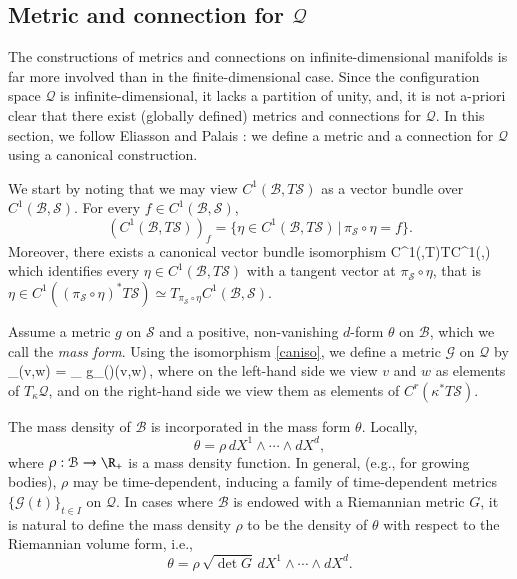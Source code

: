 \documentclass[smallextended]{svjour3}
\begin{document}
\subsection{Metric and connection for ${\mathcal{Q}}$}
\label{sec:metric_and_connection}

The constructions of metrics and connections on infinite-dimensional manifolds is far more involved than in the finite-dimensional case. Since the configuration space ${\mathcal{Q}}$ is infinite-dimensional, it lacks a partition of unity, and, it is not a-priori  clear  that there exist (globally defined) metrics and connections
for ${\mathcal{Q}}$. In this section, we follow Eliasson \cite{Eli67} and Palais \cite{Pal68}: 
we define a metric and a connection for ${\mathcal{Q}}$ using a canonical construction.

We start by noting that we may view $C^1({\mathcal{B}},T{\mathcal{S}})$ as a vector bundle over $C^1({\mathcal{B}},{\mathcal{S}})$. For every $f\in C^1({\mathcal{B}},{\mathcal{S}})$, 
\[
(C^1({\mathcal{B}},T{\mathcal{S}}))_f=\{\eta\in C^1({\mathcal{B}},T{\mathcal{S}})\,|\, \pi_{\mathcal{S}}\circ \eta=f   \}.
\]
Moreover, there exists a canonical vector bundle isomorphism 
\beq\label{caniso}
 C^1({},T{})\simeq TC^1({},{})
\eeq
which identifies every $\eta\in C^1({\mathcal{B}},T{\mathcal{S}})$ with a tangent vector at $\pi_{\mathcal{S}}\circ \eta$, that is $\eta\in C^1((\pi_{\mathcal{S}}\circ\eta)^*T{\mathcal{S}})\simeq T_{\pi_{\mathcal{S}}\circ\eta}C^1({\mathcal{B}},{\mathcal{S}})$.

Assume a metric $g$ on ${\mathcal{S}}$ and a positive, non-vanishing $d$-form $\theta$ on ${\mathcal{B}}$, which we call the \emph{mass form}.  Using the isomorphism \eqref{caniso}, we define a metric ${\mathcal{G}}$ on ${\mathcal{Q}}$ by 
\beq\label{metricdef}
{}_\kappa(v,w) = \int_{} g_{\kappa(\cdot)}(v,w)\,\theta,
\eeq
where on the left-hand side we view $v$ and $w$ as elements of $T_\kappa{\mathcal{Q}}$, and on the right-hand side we view them as elements of $C^r(\kappa^*T{\mathcal{S}})$.

The mass density of ${\mathcal{B}}$ is incorporated in the mass form $\theta$. Locally,
\[
\theta=\rho \, dX^1\wedge\cdots\wedge dX^d,
\] 
where $\rho:{\mathcal{B}}\to \R_+$ is a mass density function. 
In general, (e.g., for growing bodies), $\rho$ may be time-dependent, inducing a family of time-dependent metrics $\{{\mathcal{G}}(t)\}_{t\in I}$ on ${\mathcal{Q}}$. In cases where ${\mathcal{B}}$ is endowed with a Riemannian metric $G$, it is natural to define the mass density $\rho$ to be the density of $\theta$ with respect to the Riemannian volume form, i.e.,
\[
\theta=\rho \, \sqrt{\det G} \, dX^1\wedge\cdots\wedge dX^d.
\]
\end{document}
